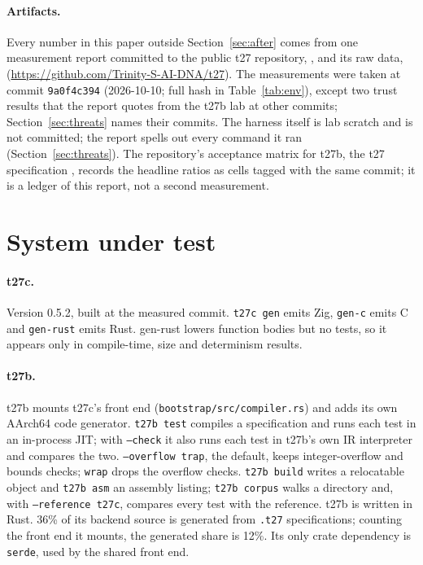\documentclass[11pt,a4paper]{article}
\begin{document}
\paragraph{Artifacts.}
Every number in this paper outside Section~\ref{sec:after} comes from
one measurement report committed to the public t27 repository,
, and its raw data,
(\url{https://github.com/Trinity-S-AI-DNA/t27}). The measurements were
taken at commit \texttt{9a0f4c394} (2026-10-10; full hash in
Table~\ref{tab:env}), except two trust results that the report quotes
from the t27b lab at other commits; Section~\ref{sec:threats} names
their commits. The harness itself is lab scratch and is not committed; the
report spells out every command it ran (Section~\ref{sec:threats}). The
repository's acceptance matrix for t27b, the t27 specification
, records the headline
ratios as cells tagged with the same commit; it is a ledger of this
report, not a second measurement.

\section{System under test}
\label{sec:sut}

\paragraph{t27c.}
Version 0.5.2, built at the measured commit. \texttt{t27c gen} emits Zig,
\texttt{gen-c} emits C and \texttt{gen-rust} emits Rust. gen-rust lowers
function bodies but no tests, so it appears only in compile-time, size and
determinism results.

\paragraph{t27b.}
t27b mounts t27c's front end (\texttt{bootstrap/src/compiler.rs}) and adds
its own AArch64 code generator. \texttt{t27b test} compiles a specification
and runs each test in an in-process JIT; with \texttt{--check} it also runs
each test in t27b's own IR interpreter and compares the two.
\texttt{--overflow trap}, the default, keeps integer-overflow and bounds
checks; \texttt{wrap} drops the overflow checks. \texttt{t27b build} writes
a relocatable object and \texttt{t27b asm} an assembly listing;
\texttt{t27b corpus} walks a directory and, with \texttt{--reference t27c},
compares every test with the reference. t27b is written in Rust. 36\% of
its backend source is generated from \texttt{.t27} specifications;
counting the front end it mounts, the generated share is 12\%. Its only
crate dependency is \texttt{serde}, used by the shared front end.
\end{document}
